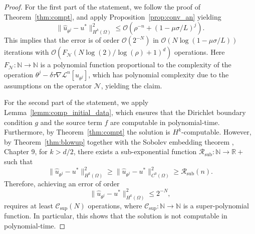 \documentclass[pdflatex]{sn-jnl}%
\begin{document}
\vspace{-1em}\begin{proof}
For the first part of the statement, we follow the proof of Theorem~\ref{thm:compt}, and apply Proposition~\ref{prop:conv_an} yielding
\begin{equation}
    \|\hat{u}_{\theta^j}-u^*\|_{H^k(\Omega)}^2\leq \mathcal{O}\left(\rho^{-n}+(1-\mu\sigma/L)^{j}\right).
\end{equation}
This implies that the error is of order $\mathcal{O}(2^{-N})$ in $\mathcal{O}(N\log(1-\mu\sigma/L))$ iterations with 
$\mathcal{O}\left(F_\mathcal{N}(N\log(2)/\log(\rho)+1)^d\right)$ operations. Here $F_\mathcal{N}:\mathbb{N}\rightarrow\mathbb{N}$ is a polynomial function proportional to the complexity of the operation $\theta^j-\delta\tau\nabla\mathcal{L}^n[\hat{u}_{\theta^j}]$, which has polynomial complexity due to the assumptions on the operator $\mathcal{N}$, yielding the claim.


For the second part of the statement, we apply Lemma~\ref{lemm:comp_initial_data}, which ensures that the Dirichlet boundary condition $g$ and the source term $f$ are computable in polynomial-time. Furthermore, by Theorem~\ref{thm:compt} the solution is $H^k$-computable. However, by Theorem~\ref{thm:blowup} together with the Sobolev embedding theorem \cite{brezis2011}, Chapter 9, for $k>d/2$, there exists a sub-exponential function $\mathcal{R}_\mathrm{sub}:\mathbb{N}\to\mathbb{R}+$ such that
\begin{equation}
    \|\hat{u}_{\theta^j}-u^*\|_{H^k(\Omega)}^2\geq\|\hat{u}_{\theta^j}-u^*\|_{C^0(\Omega)}^2 \geq \mathcal{R}_\mathrm{sub}(n).
\end{equation}
 Therefore, achieving an error of order 
 $$\|\hat{u}_{\theta^j}-u^*\|_{H^k(\Omega)}^2\leq 2^{-N},$$ requires at least $\mathcal{C}_\mathrm{sup}(N)$ operations, where $\mathcal{C}_\mathrm{sup}:\mathbb{N}\rightarrow \mathbb{N}$ is a super-polynomial function. In particular, this shows that the solution is not computable in polynomial-time.  
\end{proof}
\end{document}
